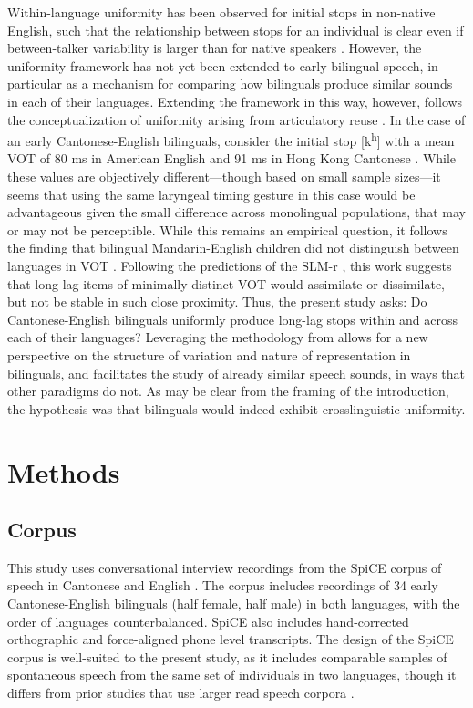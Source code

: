 Within-language uniformity has been observed for initial stops in non-native English, such that the relationship between stops for an individual is clear even if between-talker variability is larger than for native speakers \citep{chodroff_2019_l2}. However, the uniformity framework has not yet been extended to early bilingual speech, in particular as a mechanism for comparing how bilinguals produce similar sounds in each of their languages. Extending the framework in this way, however, follows the conceptualization of uniformity arising from articulatory reuse \citep{faytak_2018_uniformity}. In the case of an early Cantonese-English bilinguals, consider the initial stop [k\textsuperscript{h}] with a mean VOT of 80 ms in American English \citep{lisker_1964_vot} and 91 ms in Hong Kong Cantonese \citep{clumeck_1981_cantonese}. While these values are objectively different---though based on small sample sizes---it seems that using the same laryngeal timing gesture in this case would be advantageous given the small difference across monolingual populations, that may or may not be perceptible. While this remains an empirical question, it follows the finding that bilingual Mandarin-English children did not distinguish between languages in VOT \citep{yang_2019_vot}. Following the predictions of the SLM-r \citep{flege_2021_slmr}, this work suggests that long-lag items of minimally distinct VOT would assimilate or dissimilate, but not be stable in such close proximity. Thus, the present study asks: Do Cantonese-English bilinguals uniformly produce long-lag stops within and across each of their languages? Leveraging the methodology from \citep{chodroff_2017_structure,chodroff_2018_predictability,chodroff_2019_l2} allows for a new perspective on the structure of variation and nature of representation in bilinguals, and facilitates the study of already similar speech sounds, in ways that other paradigms do not. As may be clear from the framing of the introduction, the hypothesis was that bilinguals would indeed exhibit crosslinguistic uniformity.

\section{Methods}

\subsection{Corpus}
This study uses conversational interview recordings from the SpiCE corpus of speech in Cantonese and English \citep{johnson_2020_spice}. The corpus includes recordings of 34 early Cantonese-English bilinguals (half female, half male) in both languages, with the order of languages counterbalanced. SpiCE also includes hand-corrected orthographic and force-aligned phone level transcripts. The design of the SpiCE corpus is well-suited to the present study, as it includes comparable samples of spontaneous speech from the same set of individuals in two languages, though it differs from prior studies that use larger read speech corpora \citep{chodroff_2017_structure,chodroff_2019_l2}.

